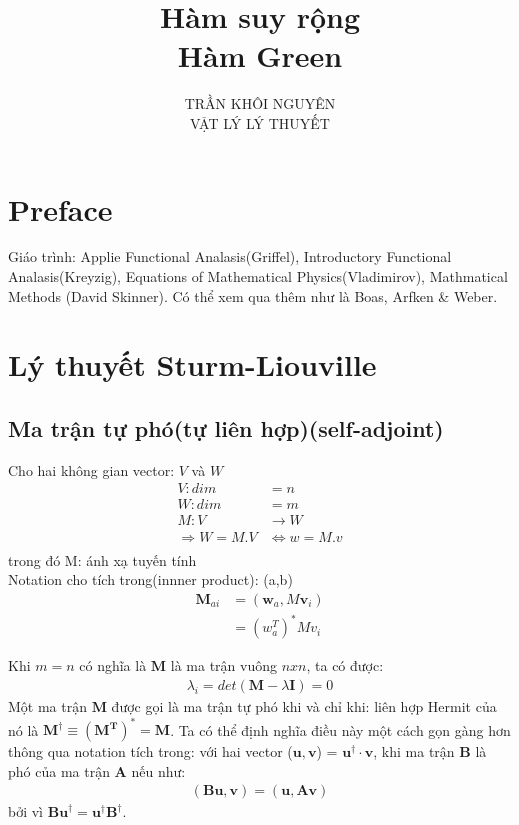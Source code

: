 \documentclass{report}
\title{\Huge{Hàm suy rộng\\Hàm Green}}
\begin{document}
\setlength{\parindent}{20pt}
\newpage
\author{TRẦN KHÔI NGUYÊN \\ VẬT LÝ LÝ THUYẾT}
\maketitle
\chapter*{Preface}
Giáo trình: Applie Functional Analasis(Griffel), Introductory Functional Analasis(Kreyzig), Equations of Mathematical Physics(Vladimirov), Mathmatical Methods (David Skinner). Có thể xem qua thêm như là Boas, Arfken \& Weber.
\tableofcontents
\chapter{Lý thuyết Sturm-Liouville}
\section{Ma trận tự phó(tự liên hợp)(self-adjoint)}
Cho hai không gian vector: $V$ và $W$
\begin{align*}
	V:dim             & = n                   \\
	W:dim             & = m                   \\
	M: V              & \rightarrow W         \\
	\Rightarrow W=M.V & \Leftrightarrow w=M.v \\
\end{align*}
trong đó M: ánh xạ tuyến tính\\
Notation cho tích trong(innner product): (a,b)
\begin{align*}
	\mathbf{M}_{ai} & =(\mathbf{w}_a,M\mathbf{v}_i) \\
	                & =(w_a^T)^{\ast}Mv_i
\end{align*}

Khi $m=n$ có nghĩa là $\mathbf{M}$ là ma trận vuông $nxn$, ta có được:
\begin{align*}
	\lambda_i = det(\mathbf{M}-\lambda\mathbf{I}) = 0
\end{align*}
Một ma trận $\mathbf{M}$ được gọi là ma trận tự phó khi và chỉ khi:
liên hợp Hermit của nó là $\mathbf{M}^\dagger \equiv (\mathbf{M^{T}})^{\ast}= \mathbf{M}$. Ta có thể định nghĩa điều này một cách gọn gàng hơn thông qua notation tích trong: với hai vector ($\mathbf{u,v}$) = $\mathbf{u^\dagger} \cdot \mathbf{v}$, khi ma trận $\mathbf{B}$ là phó của ma trận $\mathbf{A}$ nếu như:
\begin{align}
	(\mathbf{Bu,v}) = (\mathbf{u,Av})
\end{align}
bởi vì $\mathbf{Bu}^\dagger =\mathbf{u}^\dagger \mathbf{B}^\dagger $.
\end{document}
